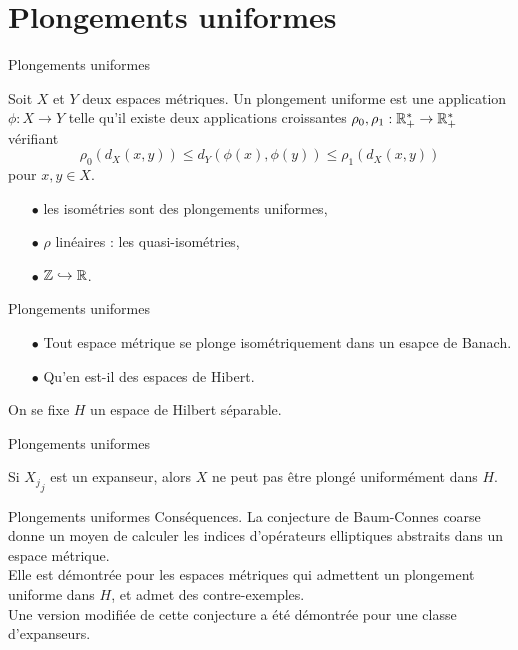 \section{Plongements uniformes}
\begin{frame}{Plongements uniformes}

\begin{defn}
Soit $X$ et $Y$ deux espaces métriques. Un plongement uniforme est une application $\phi : X\rightarrow Y$ telle qu'il existe deux applications croissantes $\rho_0,\rho_1 : \mathbb R_+^*\rightarrow \mathbb R_+^*$ vérifiant
\[\rho_0(d_X(x,y))\leq d_Y(\phi(x),\phi(y))\leq \rho_1(d_X(x,y))\] 
pour $x,y\in X$.
\end{defn}

\begin{itemize}
\item[$\bullet$] les isométries sont des plongements uniformes,
\item[$\bullet$] $\rho$ linéaires : les quasi-isométries,
\item[$\bullet$] $\mathbb Z\hookrightarrow \mathbb R$.
\end{itemize}
\end{frame}

\begin{frame}{Plongements uniformes} 
\begin{itemize}
\item[$\bullet$] Tout espace métrique se plonge isométriquement dans un esapce de Banach.
\item[$\bullet$] Qu'en est-il des espaces de Hibert.
\end{itemize}
On se fixe $H$ un espace de Hilbert séparable.
\end{frame}

\begin{frame}{Plongements uniformes} 
\begin{thm}
Si ${X_j}_j$ est un expanseur, alors $X$ ne peut pas être plongé uniformément dans $H$.
\end{thm}
\end{frame}

\begin{frame}{Plongements uniformes} 
Conséquences. 
La conjecture de Baum-Connes coarse donne un moyen de calculer les indices d'opérateurs elliptiques abstraits dans un espace métrique.\\
Elle est démontrée pour les espaces métriques qui admettent un plongement uniforme dans $H$, et admet des contre-exemples.\\
Une version modifiée de cette conjecture a été démontrée pour une classe d'expanseurs. 
\end{frame}


